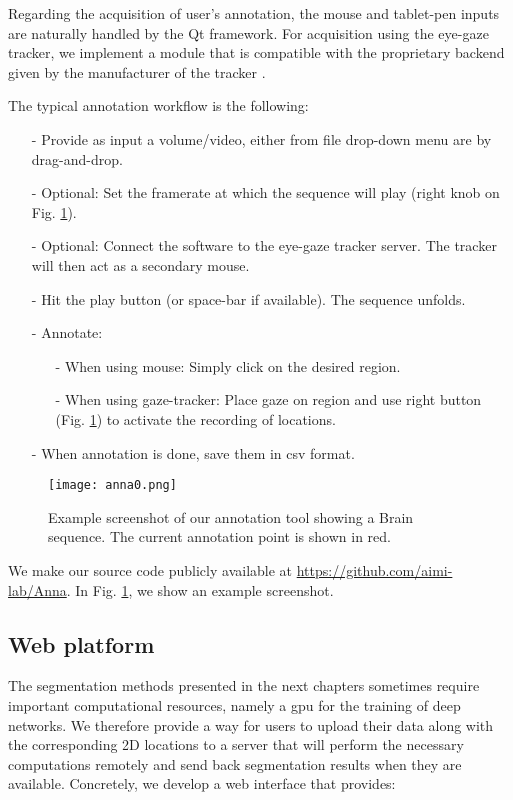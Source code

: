 Regarding the acquisition of user's annotation, the mouse and tablet-pen inputs are naturally handled by the Qt framework.
For acquisition using the eye-gaze tracker, we implement a module that is compatible with the proprietary backend given by the manufacturer of the tracker \cite{eyetribe}.

The typical annotation workflow is the following:

\begin{itemize}
  \item[-]{Provide as input a volume/video, either from file drop-down menu are by drag-and-drop.}
  \item[-]{Optional: Set the framerate at which the sequence will play (right knob on Fig. \ref{fig:anna}).}
  \item[-]{Optional: Connect the software to the eye-gaze tracker server. The tracker will then act as a secondary mouse.}
  \item[-]{Hit the play button (or space-bar if available). The sequence unfolds.}
  \item[-]{Annotate:}
    \begin{itemize}
      \item[-]{When using mouse: Simply click on the desired region.}
      \item[-]{When using gaze-tracker: Place gaze on region and use right button (Fig. \ref{fig:anna}) to activate the recording of locations.}
    \end{itemize}
  \item[-]{When annotation is done, save them in \gls{csv} format.}
\end{itemize}

\begin{figure}[!htpb]
  \texttt{[image: anna0.png]}
  \caption{Example screenshot of our annotation tool showing a Brain sequence.
  The current annotation point is shown in red.}
  \label{fig:anna}
\end{figure}

We make our source code publicly available at \url{https://github.com/aimi-lab/Anna}.
In Fig. \ref{fig:anna}, we show an example screenshot.


\subsection{Web platform}
The segmentation methods presented in the next chapters sometimes require important computational resources, namely a \gls{gpu} for the training of deep networks.
We therefore provide a way for users to upload their data along with the corresponding 2D locations to a server that will perform the necessary computations remotely and send back segmentation results when they are available.
Concretely, we develop a web interface that provides:


